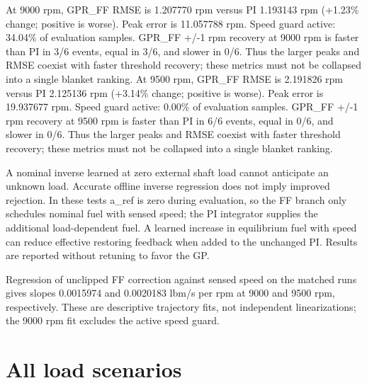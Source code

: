 At 9000 rpm, GPR\_\allowbreak FF RMSE is 1.207770 rpm versus PI 1.193143 rpm (+1.23\% change; positive is worse). Peak error is 11.057788 rpm. Speed guard active: 34.04\% of evaluation samples.
GPR\_\allowbreak FF +/-1 rpm recovery at 9000 rpm is faster than PI in 3/6 events, equal in 3/6, and slower in 0/6. Thus the larger peaks and RMSE coexist with faster threshold recovery; these metrics must not be collapsed into a single blanket ranking.
At 9500 rpm, GPR\_\allowbreak FF RMSE is 2.191826 rpm versus PI 2.125136 rpm (+3.14\% change; positive is worse). Peak error is 19.937677 rpm. Speed guard active: 0.00\% of evaluation samples.
GPR\_\allowbreak FF +/-1 rpm recovery at 9500 rpm is faster than PI in 6/6 events, equal in 0/6, and slower in 0/6. Thus the larger peaks and RMSE coexist with faster threshold recovery; these metrics must not be collapsed into a single blanket ranking.

A nominal inverse learned at zero external shaft load cannot anticipate an unknown load. Accurate offline inverse regression does not imply improved rejection. In these tests a\_\allowbreak ref is zero during evaluation, so the FF branch only schedules nominal fuel with sensed speed; the PI integrator supplies the additional load-dependent fuel. A learned increase in equilibrium fuel with speed can reduce effective restoring feedback when added to the unchanged PI. Results are reported without retuning to favor the GP.

Regression of unclipped FF correction against sensed speed on the matched runs gives slopes 0.0015974 and 0.0020183 lbm/s per rpm at 9000 and 9500 rpm, respectively. These are descriptive trajectory fits, not independent linearizations; the 9000 rpm fit excludes the active speed guard.

\section{All load scenarios}

